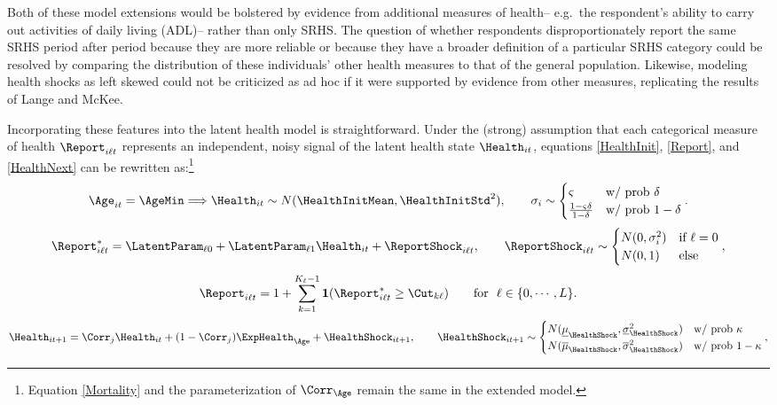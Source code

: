 Both of these model extensions would be bolstered by evidence from additional measures of health-- e.g.\ the respondent's ability to carry out activities of daily living (ADL)-- rather than only SRHS.  The question of whether respondents disproportionately report the same SRHS period after period because they are more reliable or because they have a broader definition of a particular SRHS category could be resolved by comparing the distribution of these individuals' other health measures to that of the general population.  Likewise, modeling health shocks as left skewed could not be criticized as ad hoc if it were supported by evidence from other measures, replicating the results of Lange and McKee.

Incorporating these features into the latent health model is straightforward.  Under the (strong) assumption that each categorical measure of health $\Report_{i \ell t}$ represents an independent, noisy signal of the latent health state $\Health_{it}$, equations \eqref{HealthInit}, \eqref{Report}, and \eqref{HealthNext} can be rewritten as:\footnote{Equation \eqref{Mortality} and the parameterization of $\Corr_{\Age}$ remain the same in the extended model.}
\begin{equation}\label{HealthInitAlt}
\Age_{it}=\AgeMin \Longrightarrow \Health_{it} \sim N(\HealthInitMean, \HealthInitStd^2), \qquad \sigma_{i} \sim
 \begin{cases}
 \varsigma & \text{w/ prob } \delta \\
 \frac{1 - \varsigma \delta}{1-\delta} & \text{w/ prob } 1-\delta
 \end{cases}.
\end{equation}
\begin{equation}\label{ReportAlt}
\Report^*_{i\ell t} = \LatentParam_{\ell 0} + \LatentParam_{\ell 1} \Health_{it} + \ReportShock_{i\ell t}, \qquad \ReportShock_{i\ell t} \sim
\begin{cases}
N(0,\sigma^2_i) & \text{if } \ell=0 \\
N(0,1) & \text{else}
\end{cases},
\end{equation}
\begin{equation*}\Report_{i\ell t} = 1 + \sum_{k = 1}^{K_\ell-1} \mathbf{1}(\Report^*_{i\ell t} \geq \Cut_{k \ell})  \qquad \text{for}~~ \ell \in \{0,\cdots,L\}. 
\end{equation*}
\begin{equation}\label{HealthNextAlt}
\Health_{it+1} = \Corr_{j} \Health_{it} + (1-\Corr_j) \ExpHealth_\Age + \HealthShock_{it+1}, \qquad \HealthShock_{it+1} \sim 
\begin{cases}
N(\underline{\mu}_\HealthShock, \underline{\sigma}_\HealthShock^2) & \text{w/ prob } \kappa \\
N(\overline{\mu}_\HealthShock, \overline{\sigma}_\HealthShock^2) & \text{w/ prob } 1-\kappa
\end{cases},
\end{equation}
